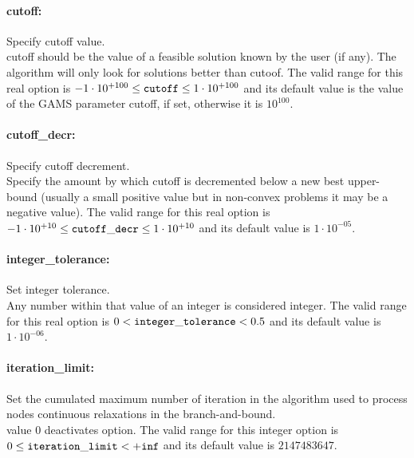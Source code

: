 \paragraph{cutoff:} Specify cutoff value. $\;$ \\
 cutoff should be the value of a feasible solution
known by the user (if any). The algorithm will
only look for solutions better than cutoof. The valid range for this real option is 
$-1 \cdot 10^{+100} \le {\tt cutoff } \le 1 \cdot 10^{+100}$
and its default value is the value of the GAMS parameter cutoff, if set, otherwise it is $10^{100}$.


\paragraph{cutoff\_decr:} Specify cutoff decrement. $\;$ \\
 Specify the amount by which cutoff is decremented
below a new best upper-bound (usually a small
positive value but in non-convex problems it may
be a negative value). The valid range for this real option is 
$-1 \cdot 10^{+10} \le {\tt cutoff\_decr } \le 1 \cdot 10^{+10}$
and its default value is $1 \cdot 10^{-05}$.


\paragraph{integer\_tolerance:} Set integer tolerance. $\;$ \\
 Any number within that value of an integer is
considered integer. The valid range for this real option is 
$0 <  {\tt integer\_tolerance } <  0.5$
and its default value is $1 \cdot 10^{-06}$.


\paragraph{iteration\_limit:} Set the cumulated maximum number of iteration in the algorithm used to process nodes continuous relaxations in the branch-and-bound. $\;$ \\
 value 0 deactivates option. The valid range for this integer option is
$0 \le {\tt iteration\_limit } <  {\tt +inf}$
and its default value is $2147483647$.


